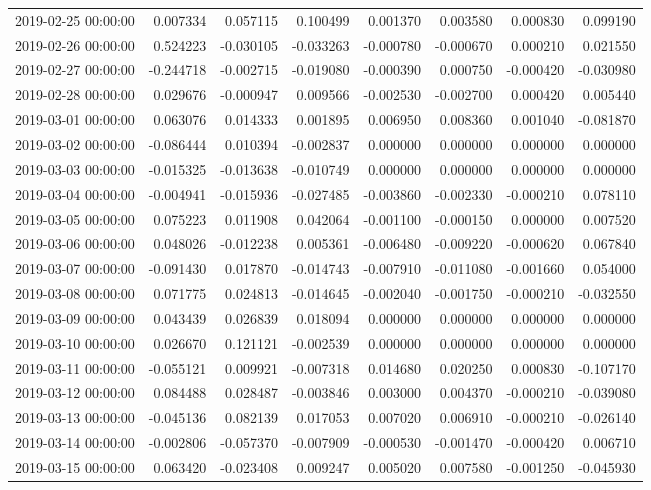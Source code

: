\begin{tabular}{lrrrrrrr}
2019-02-25 00:00:00 & 0.007334 & 0.057115 & 0.100499 & 0.001370 & 0.003580 & 0.000830 & 0.099190 \\
2019-02-26 00:00:00 & 0.524223 & -0.030105 & -0.033263 & -0.000780 & -0.000670 & 0.000210 & 0.021550 \\
2019-02-27 00:00:00 & -0.244718 & -0.002715 & -0.019080 & -0.000390 & 0.000750 & -0.000420 & -0.030980 \\
2019-02-28 00:00:00 & 0.029676 & -0.000947 & 0.009566 & -0.002530 & -0.002700 & 0.000420 & 0.005440 \\
2019-03-01 00:00:00 & 0.063076 & 0.014333 & 0.001895 & 0.006950 & 0.008360 & 0.001040 & -0.081870 \\
2019-03-02 00:00:00 & -0.086444 & 0.010394 & -0.002837 & 0.000000 & 0.000000 & 0.000000 & 0.000000 \\
2019-03-03 00:00:00 & -0.015325 & -0.013638 & -0.010749 & 0.000000 & 0.000000 & 0.000000 & 0.000000 \\
2019-03-04 00:00:00 & -0.004941 & -0.015936 & -0.027485 & -0.003860 & -0.002330 & -0.000210 & 0.078110 \\
2019-03-05 00:00:00 & 0.075223 & 0.011908 & 0.042064 & -0.001100 & -0.000150 & 0.000000 & 0.007520 \\
2019-03-06 00:00:00 & 0.048026 & -0.012238 & 0.005361 & -0.006480 & -0.009220 & -0.000620 & 0.067840 \\
2019-03-07 00:00:00 & -0.091430 & 0.017870 & -0.014743 & -0.007910 & -0.011080 & -0.001660 & 0.054000 \\
2019-03-08 00:00:00 & 0.071775 & 0.024813 & -0.014645 & -0.002040 & -0.001750 & -0.000210 & -0.032550 \\
2019-03-09 00:00:00 & 0.043439 & 0.026839 & 0.018094 & 0.000000 & 0.000000 & 0.000000 & 0.000000 \\
2019-03-10 00:00:00 & 0.026670 & 0.121121 & -0.002539 & 0.000000 & 0.000000 & 0.000000 & 0.000000 \\
2019-03-11 00:00:00 & -0.055121 & 0.009921 & -0.007318 & 0.014680 & 0.020250 & 0.000830 & -0.107170 \\
2019-03-12 00:00:00 & 0.084488 & 0.028487 & -0.003846 & 0.003000 & 0.004370 & -0.000210 & -0.039080 \\
2019-03-13 00:00:00 & -0.045136 & 0.082139 & 0.017053 & 0.007020 & 0.006910 & -0.000210 & -0.026140 \\
2019-03-14 00:00:00 & -0.002806 & -0.057370 & -0.007909 & -0.000530 & -0.001470 & -0.000420 & 0.006710 \\
2019-03-15 00:00:00 & 0.063420 & -0.023408 & 0.009247 & 0.005020 & 0.007580 & -0.001250 & -0.045930 \\

\end{tabular}
